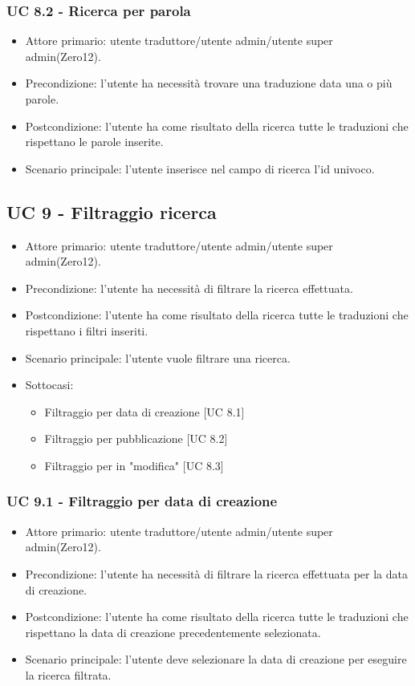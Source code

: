     \subsubsection{UC 8.2 - Ricerca per parola}
        \begin{itemize}
            \item Attore primario: utente traduttore/utente admin/utente super admin(Zero12).
            \item Precondizione: l'utente ha necessità trovare una traduzione data una o più parole.
            \item Postcondizione: l'utente ha come risultato della ricerca tutte le traduzioni che rispettano le parole inserite.
            \item Scenario principale: l'utente inserisce nel campo di ricerca l'id univoco.
        \end{itemize}
\subsection{UC 9 - Filtraggio ricerca}
    \begin{itemize}
        \item Attore primario: utente traduttore/utente admin/utente super admin(Zero12).
        \item Precondizione: l'utente ha necessità di filtrare la ricerca effettuata.
        \item Postcondizione: l'utente ha come risultato della ricerca tutte le traduzioni che rispettano i filtri inseriti.
        \item Scenario principale: l'utente vuole filtrare una ricerca.
        \item Sottocasi:
            \begin{itemize}
                \item Filtraggio per data di creazione [UC 8.1]
                \item Filtraggio per pubblicazione [UC 8.2]
                \item Filtraggio per in "modifica" [UC 8.3]
            \end{itemize}
    \end{itemize}  
    \subsubsection{UC 9.1 - Filtraggio per data di creazione}
        \begin{itemize}
            \item Attore primario: utente traduttore/utente admin/utente super admin(Zero12).
            \item Precondizione: l'utente ha necessità di filtrare la ricerca effettuata per la data di creazione.
            \item Postcondizione: l'utente ha come risultato della ricerca tutte le traduzioni che rispettano la data di creazione precedentemente selezionata. 
            \item Scenario principale: l'utente deve selezionare la data di creazione per eseguire la ricerca filtrata.
        \end{itemize}
